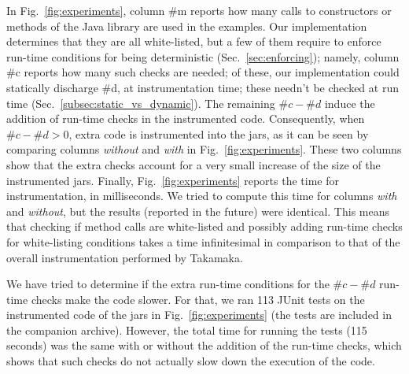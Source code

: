 In Fig.~\ref{fig:experiments}, column \#m reports how many calls to constructors
or methods of the Java library are used in the examples. Our implementation
determines that they are all white-listed,
but a few of them require to enforce run-time conditions for being deterministic
(Sec.~\ref{sec:enforcing}); namely, column \#c reports how many such checks are needed;
of these, our implementation could statically discharge \#d, at instrumentation time; these needn't
be checked at run time (Sec.~\ref{subsec:static_vs_dynamic}). The remaining
$\#c - \#d$ induce the addition of run-time checks in the instrumented code. Consequently,
when $\#c - \#d > 0$, extra code is instrumented into the jars, as it can be seen by comparing
columns \emph{without} and \emph{with} in Fig.~\ref{fig:experiments}. These two columns
show that the extra checks account for a very small increase of the size of the instrumented jars.
Finally, Fig.~\ref{fig:experiments} reports the time for instrumentation, in milliseconds.
We tried to compute this time for columns \emph{with} and \emph{without}, but the results
(reported in the future) were identical. This means that
checking if method calls are white-listed and possibly adding run-time checks for white-listing
conditions takes a time infinitesimal in comparison to that of the overall instrumentation
performed by Takamaka.

We have tried to determine if the extra run-time conditions for the $\#c - \#d$ run-time checks
make the code slower. For that, we ran 113 JUnit tests on the instrumented code of the jars in Fig.~\ref{fig:experiments}
(the tests are included in the companion archive). However, the total time for running the
tests (115 seconds) was the same with or without the addition of the run-time checks, which shows that
such checks do not actually slow down the execution of the code.
